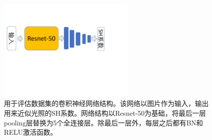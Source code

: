 \begin{figure}[!htbp]
    \centering
    \includegraphics[width=0.6\textwidth]{Img/data-network.pdf}
    \caption[用于评估数据集的卷积神经网络结构]
    {用于评估数据集的卷积神经网络结构。该网络以图片作为输入，输出用来近似光照的SH系数。网络结构以Resnet-50\cite{he2016deep}为基础，将最后一层pooling层替换为5个全连接层。除最后一层外，每层之后都有BN和RELU激活函数。}
    \label{fig:data-network}
\end{figure}